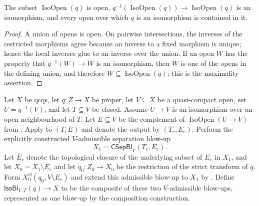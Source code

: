 \begin{lemma}
  \label{lemma:nagata-maximal-isomorphism-open}

  The subset $\operatorname{IsoOpen}(q)$ is open,
  $q^{-1}(\operatorname{IsoOpen}(q))\to\operatorname{IsoOpen}(q)$ is an
  isomorphism, and every open over which $q$ is an isomorphism is contained in
  it.
\end{lemma}

\begin{proof}
  A union of opens is open.  On pairwise intersections, the inverses of the
  restricted morphisms agree because an inverse to a fixed morphism is unique;
  hence the local inverses glue to an inverse over the union.  If an open
  $W$ has the property that $q^{-1}(W)\to W$ is an isomorphism, then $W$ is
  one of the opens in the defining union, and therefore $W\subseteq
  \operatorname{IsoOpen}(q)$; this is the maximality assertion.
\end{proof}

\begin{definition}
  \label{def:nagata-isomorphism-near-closure}

  Let $X$ be qcqs, let $q\colon Z\to X$ be proper, let $V\subseteq X$ be a
  quasi-compact open, set
  $U=q^{-1}(V)$, and let $T\subseteq V$ be closed.  Assume $U\to V$ is an
  isomorphism over an open neighbourhood of $T$.  Let $E\subseteq V$ be
  the complement of $\operatorname{IsoOpen}(U\to V)$ from
  .
  Apply  to $(T,E)$ and
  denote the output by $(T_c,E_c)$.  Perform the explicitly constructed
  $V$-admissible separation blow-up
  \[
    X_1=\mathsf{CSepBl}_V(T_c,E_c).
  \]
  Let $\overline E_c$ denote the topological closure of the underlying subset
  of $E_c$ in $X_1$, and let
  $X_0=X_1\setminus\overline E_c$ and let $q_0\colon Z_0\to X_0$ be the
  restriction of the strict transform of $q$.  Form
  $X_0^{\mathrm{el}}(q_0,V\setminus E_c)$ and extend this admissible blow-up
  to $X_1$ by .  Define
  $\mathsf{IsoBl}_{V,T}(q)\to X$ to be the composite of these two
  $V$-admissible blow-ups, represented as one blow-up by the composition
  construction.
\end{definition}

